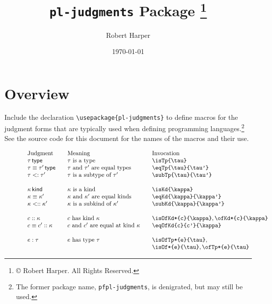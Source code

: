 \documentclass[11pt]{article}
\title{\texttt{pl-judgments} Package%
\footnote{\copyright{} \the\year{} Robert Harper.  All Rights Reserved.}}
\author{Robert Harper}
\date{\today}
\begin{document}
\maketitle{}

\section*{Overview}

Include the declaration \verb|\usepackage{pl-judgments}| to define macros for the judgment forms that are typically used when defining programming languages.\footnote{The former package name, \texttt{pfpl-judgments}, is denigrated, but may still be used.}  See the source code for this document for the names of the macros and their use.

\begin{figure}[tp]
    \begin{displaymath}
        \begin{array}{l@{\qquad} l@{\qquad}l}
            \text{Judgment}   & \text{Meaning}  & \text{Invocation} \\
            \isTp{\tau}            & \tau\ \text{is a type} & \verb|\isTp{\tau}| \\
            \eqTp{\tau}{\tau'}     & \tau\ \text{and}\ \tau'\ \text{are equal types} & \verb|\eqTp{\tau}{\tau'}| \\
            \subTp{\tau}{\tau'}    & \tau\ \text{is a subtype of}\ \tau' & \verb|\subTp{\tau}{\tau'}| \\\\
            \isKd{\kappa}          & \kappa\ \text{is a kind} & \verb|\isKd{\kappa}| \\
            \eqKd{\kappa}{\kappa'} & \kappa\ \text{and}\ \kappa'\ \text{are equal kinds} & \verb|\eqKd{\kappa}{\kappa'}| \\
            \subKd{\kappa}{\kappa'} & \kappa\ \text{is a subkind of}\ \kappa' & \verb|\subKd{\kappa}{\kappa'}| \\\\
            \isOfKd{c}{\kappa}   & c\ \text{has kind}\ \kappa & \verb|\isOfKd*{c}{\kappa}|, \verb|\ofKd*{c}{\kappa}| \\
            \eqOfKd{c}{c'}{\kappa} & c\ \text{and}\ c'\ \text{are equal at kind}\ \kappa & \verb|\eqOfKd{c}{c'}{\kappa}| \\\\
            \isOfTp{e}{\tau}         & e\ \text{has type}\ \tau & \verb|\isOfTp*{e}{\tau}|, \\
            & & \verb|\isOf*{e}{\tau}|, \verb|\ofTp*{e}{\tau}| \\

\end{array}
\end{displaymath}
\end{figure}
\end{document}
